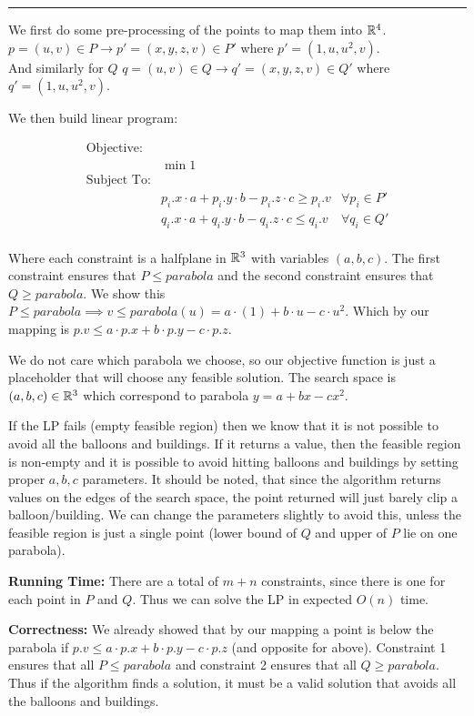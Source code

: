 \documentclass[11pt]{article}
\begin{document}
\hrule

We first do some pre-processing of the points to map them into $\mathbb{R} ^4$.
$p = (u,v) \in P \to p' = (x, y, z, v) \in P'$ where $p' = (1, u, u^2, v)$. \\
And similarly for $Q$ $q = (u,v) \in Q \to q' = (x, y, z, v) \in Q'$ where $q' = (1, u, u^2, v)$. 

We then build linear program:

\begin{align*}
  \text{Objective: }\, & & \\
  & \min 1 & \\
  \text{Subject To:} & & \\
  & p_i.x \cdot a + p_i.y \cdot b - p_i.z \cdot c \geq p_i.v & \forall p_i \in P' \\
  & q_i.x \cdot a + q_i.y \cdot b - q_i.z \cdot c \leq q_i.v & \forall q_i \in Q' \\
\end{align*}

Where each constraint is a halfplane in $\mathbb{R}^3$ with variables $(a,b,c)$. 
The first constraint ensures that $P \leq parabola$ and the second constraint ensures 
that $Q \geq parabola$. We show this $P \leq parabola \implies v \leq parabola(u) = a \cdot (1) + b \cdot u - c \cdot u^2$.
Which by our mapping is $p.v \leq a \cdot p.x + b \cdot p.y - c \cdot p.z$.

We do not care which parabola we choose, so our objective function is just a placeholder
that will choose any feasible solution. 
The search space is $(a,b,c) \in \mathbb{R} ^3$ which correspond to parabola $y = a + bx - cx^2$.

If the LP fails (empty feasible region) then we know that it is not possible to avoid all the balloons
and buildings. If it returns a value, then the feasible region is non-empty and it is possible to avoid
hitting balloons and buildings by setting proper $a, b, c$ parameters.
It should be noted, that since the algorithm returns values on the edges of the search space,
the point returned will just barely clip a balloon/building. We can change the parameters slightly
to avoid this, unless the feasible region is just a single point (lower bound of $Q$ and upper of $P$ lie on one parabola).


\textbf{Running Time:} There are a total of $m + n$ constraints, since there is one for each point in $P$ and $Q$.
Thus we can solve the LP in expected $O(n)$ time.

\textbf{Correctness: } We already showed that by our mapping a point is below the parabola
if $p.v \leq a \cdot p.x + b \cdot p.y - c \cdot p.z$ (and opposite for above). 
Constraint 1 ensures that all $P \leq parabola$ and constraint 2 ensures that all $Q \geq parabola$.
Thus if the algorithm finds a solution, it must be a valid solution that avoids all the balloons and buildings.
\end{document}
